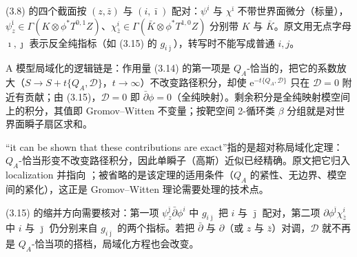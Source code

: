 \begin{yizhu}[易错点]
(3.8) 的四个截面按 $(z,\bar z)$ 与 $(i,\bar\imath)$ 配对：$\psi^{i}$ 与 $\chi^{\bar\imath}$ 不带世界面微分（标量），$\psi^{\bar\imath}_{z}\in\Gamma(K\otimes\phi^{*}T^{0,1}Z)$、$\chi^{i}_{\bar z}\in\Gamma(\bar K\otimes\phi^{*}T^{1,0}Z)$ 分别带 $K$ 与 $\bar K$。原文用无点字母 $\imath,\jmath$ 表示反全纯指标（如 (3.15) 的 $g_{i\bar\jmath}$），转写时不能写成普通 $i,j$。
\end{yizhu}

\begin{yizhu}[物理图像]
A 模型局域化的逻辑链是：作用量 (3.14) 的第一项是 $Q_A$-恰当的，把它的系数放大（$S\to S+t\{Q_A,\mathcal{D}\}$，$t\to\infty$）不改变路径积分，却使 $\mathrm{e}^{-t\{Q_A,\mathcal{D}\}}$ 只在 $\mathcal{D}=0$ 附近有贡献；由 (3.15)，$\mathcal{D}=0$ 即 $\bar\partial\phi=0$（全纯映射）。剩余积分是全纯映射模空间上的积分，其值即 Gromov--Witten 不变量；按靶空间 2-循环类 $\beta$ 分组就是对世界面瞬子扇区求和。
\end{yizhu}

\begin{yizhu}[含糊点]
“it can be shown that these contributions are exact”指的是超对称局域化定理：$Q_A$-恰当形变不改变路径积分，因此单瞬子（高斯）近似已经精确。原文把它归入 localization 并指向 \cite{ref9,ref10}；被省略的是该定理的适用条件（$Q_A$ 的紧性、无边界、模空间的紧化），这正是 Gromov--Witten 理论需要处理的技术点。
\end{yizhu}

\begin{yizhu}[易错点]
(3.15) 的缩并方向需要核对：第一项 $\psi^{\bar\jmath}_{z}\bar\partial\phi^{i}$ 中 $g_{i\bar\jmath}$ 把 $i$ 与 $\bar\jmath$ 配对，第二项 $\partial\phi^{\bar\jmath}\chi^{i}_{\bar z}$ 中 $i$ 与 $\bar\jmath$ 仍分别来自 $g_{i\bar\jmath}$ 的两个指标。若把 $\bar\partial$ 与 $\partial$（或 $z$ 与 $\bar z$）对调，$\mathcal{D}$ 就不再是 $Q_A$-恰当项的搭档，局域化方程也会改变。
\end{yizhu}


